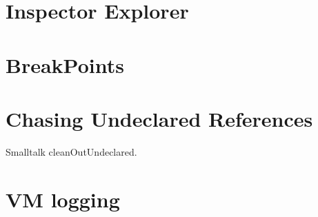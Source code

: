 \documentclass[a4paper,10pt,twoside]{book}
\begin{document}
\section{Inspector Explorer}


\section{BreakPoints}

\section{Chasing Undeclared References}
Smalltalk cleanOutUndeclared. 

\section{VM logging}





\ifx\wholebook\relax\else
\end{document}
